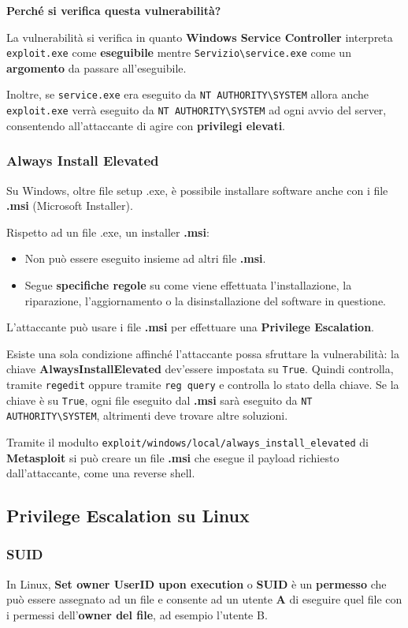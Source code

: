 \documentclass{article}
\begin{document}
\textbf{Perché si verifica questa vulnerabilità?}

La vulnerabilità si verifica in quanto \textbf{Windows Service Controller} interpreta \verb|exploit.exe| come \textbf{eseguibile} mentre \verb|Servizio\service.exe| come un \textbf{argomento} da passare all'eseguibile. 

Inoltre, se \verb|service.exe| era eseguito da \verb|NT AUTHORITY\SYSTEM| allora anche \verb|exploit.exe| verrà eseguito da \verb|NT AUTHORITY\SYSTEM| ad ogni avvio del server, consentendo all'attaccante di agire con \textbf{privilegi elevati}.

\subsubsection{Always Install Elevated}
Su Windows, oltre file setup .exe, è possibile installare software anche con i file \textbf{.msi} (Microsoft Installer).

Rispetto ad un file .exe, un installer \textbf{.msi}:
\begin{itemize}
	\item Non può essere eseguito insieme ad altri file \textbf{.msi}.
	\item Segue \textbf{specifiche regole} su come viene effettuata l’installazione, la riparazione, l’aggiornamento o la disinstallazione del software in questione.
\end{itemize}

L'attaccante può usare i file \textbf{.msi} per effettuare una \textbf{Privilege Escalation}. 

Esiste una sola condizione affinché l'attaccante possa sfruttare la vulnerabilità: la chiave \textbf{AlwaysInstallElevated} dev'essere impostata su \verb|True|. Quindi controlla, tramite \verb|regedit| oppure tramite \verb|reg query| e controlla lo stato della chiave. Se la chiave è su \verb|True|, ogni file eseguito dal \textbf{.msi} sarà eseguito da \verb|NT AUTHORITY\SYSTEM|, altrimenti deve trovare altre soluzioni.

Tramite il modulto \verb|exploit/windows/local/always_install_elevated| di \textbf{Metasploit} si può creare un file \textbf{.msi} che esegue il payload richiesto dall'attaccante, come una reverse shell.

\subsection{Privilege Escalation su Linux}
\subsubsection{SUID}
In Linux, \textbf{Set owner UserID upon execution} o \textbf{SUID} è un \textbf{permesso} che può essere assegnato ad un file e consente ad un utente \textbf{A} di eseguire quel file con i permessi dell’\textbf{owner del file}, ad esempio l’utente B.
\end{document}
